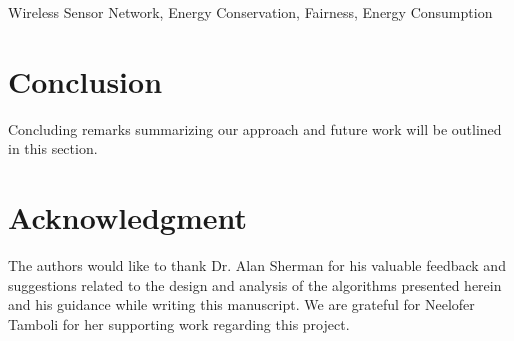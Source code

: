 \documentclass[11pt,conference]{IEEEtran}
\begin{document}
\begin{keywords}
Wireless Sensor Network, Energy Conservation, Fairness, Energy Consumption
\end{keywords}

\IEEEpeerreviewmaketitle








\section{Conclusion}\label{conclusion}
Concluding remarks summarizing our approach and future work will be outlined in this section.

\section*{Acknowledgment}

The authors would like to thank Dr. Alan Sherman for his valuable feedback and suggestions related to the design and analysis of the algorithms presented herein and his guidance while writing this manuscript. We are grateful for Neelofer Tamboli for her supporting work regarding this project.







\end{document}
